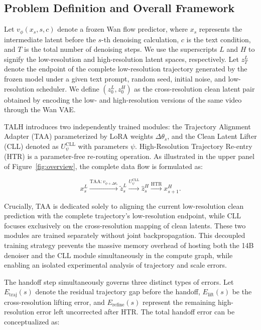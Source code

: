 \subsection{Problem Definition and Overall Framework}

Let \(v_\phi(x_s, s, c)\) denote a frozen Wan flow predictor, where
\(x_s\) represents the intermediate latent before the \(s\)-th denoising
calculation, \(c\) is the text condition, and \(T\) is the total number
of denoising steps. We use the superscripts \(L\) and \(H\) to signify
the low-resolution and high-resolution latent spaces, respectively. Let
\(z_T^L\) denote the endpoint of the complete low-resolution trajectory
generated by the frozen model under a given text prompt, random seed,
initial noise, and low-resolution scheduler. We define
\((z_0^L, z_0^H)\) as the cross-resolution clean latent pair obtained by
encoding the low- and high-resolution versions of the same video through
the Wan VAE.

TALH introduces two independently trained modules: the Trajectory
Alignment Adapter (TAA) parameterized by LoRA weights
\(\Delta\theta_s\), and the Clean Latent Lifter (CLL) denoted as
\(U_\psi^{\mathrm{CLL}}\) with parameters \(\psi\). High-Resolution
Trajectory Re-entry (HTR) is a parameter-free re-routing operation. As
illustrated in the upper panel of Figure~\ref{fig:overview}, the complete data flow is
formulated as:

\[
x_s^L \xrightarrow{\mathrm{TAA}:v_{\phi+\Delta\theta_s}}
\widetilde z_s^L \xrightarrow{U_\psi^{\mathrm{CLL}}}
\widehat z_s^H \xrightarrow{\mathrm{HTR}} x_{s+1}^H.
\]

Crucially, TAA is dedicated solely to aligning the current
low-resolution clean prediction with the complete trajectory's
low-resolution endpoint, while CLL focuses exclusively on the
cross-resolution mapping of clean latents. These two modules are trained
separately without joint backpropagation. This decoupled training
strategy prevents the massive memory overhead of hosting both the 14B
denoiser and the CLL module simultaneously in the compute graph, while
enabling an isolated experimental analysis of trajectory and scale
errors.

The handoff step simultaneously governs three distinct types of errors.
Let \(E_{\mathrm{traj}}(s)\) denote the residual trajectory gap before
the handoff, \(E_{\mathrm{lift}}(s)\) be the cross-resolution lifting
error, and \(E_{\mathrm{refine}}(s)\) represent the remaining
high-resolution error left uncorrected after HTR. The total handoff
error can be conceptualized as:

